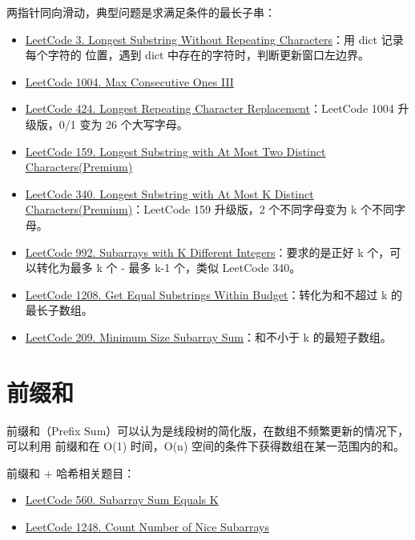两指针同向滑动，典型问题是求满足条件的最长子串：
\begin{itemize}
  \item
    \href{https://leetcode.com/problems/longest-substring-without-repeating-characters/submissions/}{LeetCode
      3. Longest Substring Without Repeating Characters}：用 dict 记录每个字符的
    位置，遇到 dict 中存在的字符时，判断更新窗口左边界。
  \item
    \href{https://leetcode.com/problems/max-consecutive-ones-iii/}{LeetCode 1004. Max Consecutive Ones III}
  \item
    \href{https://leetcode.com/problems/longest-repeating-character-replacement/}{LeetCode
      424. Longest Repeating Character Replacement}：LeetCode 1004 升级版，0/1 变为 26 个大写字母。
  \item
    \href{https://leetcode.com/problems/longest-substring-with-at-most-two-distinct-characters}{LeetCode
      159. Longest Substring with At Most Two Distinct Characters(Premium)}
  \item
    \href{https://leetcode.com/problems/longest-substring-with-at-most-k-distinct-characters}{LeetCode
      340. Longest Substring with At Most K Distinct Characters(Premium)}：LeetCode 159
    升级版，2 个不同字母变为 k 个不同字母。
  \item
    \href{https://leetcode.com/problems/subarrays-with-k-different-integers}{LeetCode
    992. Subarrays with K Different Integers}：要求的是正好 k 个，可以转化为最多
  k 个 - 最多 k-1 个，类似 LeetCode 340。
  \item
    \href{https://leetcode.com/problems/get-equal-substrings-within-budget/}{LeetCode
      1208. Get Equal Substrings Within Budget}：转化为和不超过 k 的最长子数组。
  \item
    \href{https://leetcode.com/problems/minimum-size-subarray-sum/}{LeetCode
      209. Minimum Size Subarray Sum}：和不小于 k 的最短子数组。
\end{itemize}

\section{前缀和}
前缀和（Prefix Sum）可以认为是线段树的简化版，在数组不频繁更新的情况下，可以利用
前缀和在 O(1) 时间，O(n) 空间的条件下获得数组在某一范围内的和。

前缀和 + 哈希相关题目：
\begin{itemize}
  \item
    \href{https://leetcode.com/problems/subarray-sum-equals-k/}{LeetCode 560. Subarray Sum Equals K}
  \item
    \href{https://leetcode.com/problems/count-number-of-nice-subarrays/}{LeetCode
      1248. Count Number of Nice Subarrays}
\end{itemize}

